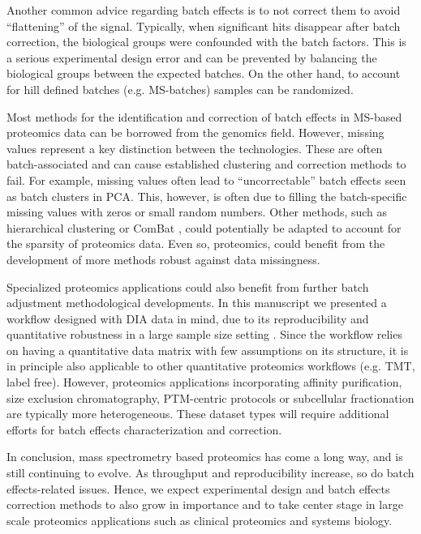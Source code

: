 \documentclass[num-refs]{wiley-article}
\begin{document}
Another common advice regarding batch effects is to not correct them to avoid “flattening” of the signal. Typically, when significant hits disappear after batch correction, the biological groups were confounded with the batch factors. This is a serious experimental design error and can be prevented by balancing the biological groups between the expected batches. On the other hand, to account for hill defined batches (e.g. MS-batches) samples can be randomized.

Most methods for the identification and correction of batch effects in MS-based proteomics data can be borrowed from the genomics field. However, missing values represent a key distinction between the technologies. These are often batch-associated and can cause established clustering and correction methods to fail. For example, missing values often lead to “uncorrectable” batch effects seen as batch clusters in PCA. This, however, is often due to filling the batch-specific missing values with zeros or small random numbers. Other methods, such as hierarchical clustering or ComBat \cite{Johnston2005a}, could potentially be adapted to account for the sparsity of proteomics data. Even so, proteomics, could benefit from the development of more methods robust against data missingness.

Specialized proteomics applications could also benefit from further batch adjustment methodological developments. In this manuscript we presented a workflow designed with DIA data in mind, due to its reproducibility and quantitative robustness in a large sample size setting \cite{Collins2017}. Since the workflow relies on having a quantitative data matrix with few assumptions on its structure, it is in principle also applicable to other quantitative proteomics workflows (e.g. TMT, label free). However, proteomics applications incorporating affinity purification, size exclusion chromatography, PTM-centric protocols or subcellular fractionation are typically more heterogeneous. These dataset types will require additional efforts for batch effects characterization and correction.

In conclusion, mass spectrometry based proteomics has come a long way, and is still continuing to evolve. As throughput and reproducibility increase, so do batch effects-related issues. Hence, we expect experimental design and batch effects correction methods to also grow in importance and to take center stage in  large scale proteomics applications such as clinical proteomics and systems biology.
\end{document}
